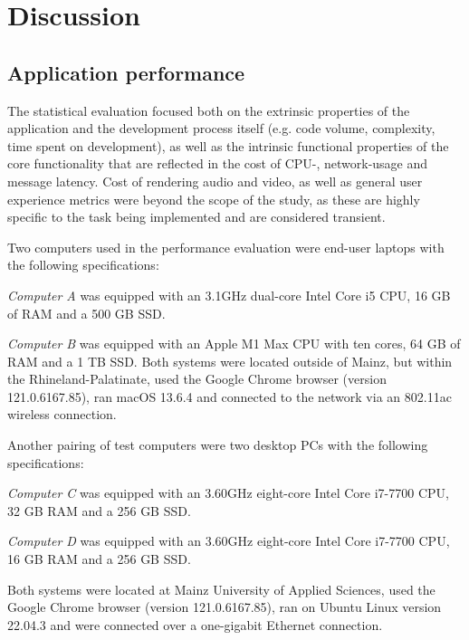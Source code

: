 \chapter{Discussion}
\label{ch:discussion}


\section{Application performance}
\label{sec:statistics}

The statistical evaluation focused both on the extrinsic properties of the application and the development process itself (e.g. code volume, complexity, time spent on development), as well as the intrinsic functional properties of the core functionality that are reflected in the cost of \ac{CPU}-, network-usage and message latency.
Cost of rendering audio and video, as well as general user experience metrics were beyond the scope of the study, as these are highly specific to the task being implemented and are considered transient.

Two computers used in the performance evaluation were end-user laptops with the following specifications:

\emph{Computer A} was equipped with an 3.1GHz dual-core Intel Core i5 \ac{CPU}, 16 \ac{GB} of \ac{RAM} and a 500 \ac{GB} \ac{SSD}.

\emph{Computer B} was equipped with an Apple M1 Max \ac{CPU} with ten cores, 64 \ac{GB} of \ac{RAM} and a 1 \ac{TB} \ac{SSD}.
Both systems were located outside of Mainz, but within the Rhineland-Palatinate, used the Google Chrome browser (version 121.0.6167.85), ran macOS 13.6.4 and connected to the network via an 802.11ac wireless connection.

Another pairing of test computers were two desktop \acp{PC} with the following specifications:

\emph{Computer C} was equipped with an 3.60GHz eight-core Intel Core i7-7700 \ac{CPU}, 32 \ac{GB} \ac{RAM} and a 256 \ac{GB} \ac{SSD}.

\emph{Computer D} was equipped with an 3.60GHz eight-core Intel Core i7-7700 \ac{CPU}, 16 \ac{GB} \ac{RAM} and a 256 \ac{GB} \ac{SSD}.

Both systems were located at Mainz University of Applied Sciences, used the Google Chrome browser (version 121.0.6167.85), ran on Ubuntu Linux version 22.04.3 and were connected over a one-gigabit Ethernet connection.

